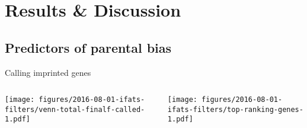 \documentclass{beamer}
\begin{document}
\section{Results \& Discussion}
\subsection{Predictors of parental bias}

\begin{frame}[label=toc-current]
\tableofcontents[currentsection]
\end{frame}

\begin{frame}[label=filtering-calling]{Calling imprinted genes}
\begin{columns}[t]
\begin{column}{0.5\textwidth}

\texttt{[image: figures/2016-08-01-ifats-filters/venn-total-finalf-called-1.pdf]}
\end{column}

\begin{column}{0.5\textwidth}

\texttt{[image: figures/2016-08-01-ifats-filters/top-ranking-genes-1.pdf]}
\end{column}
\end{columns}
\end{frame}
\end{document}
